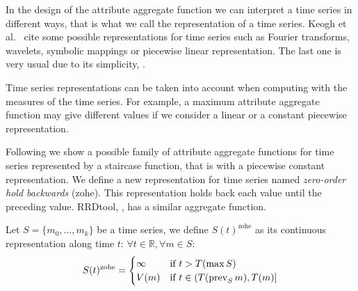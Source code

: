 


In the design of the attribute aggregate function we can interpret a
time series in different ways, that is what we call the representation
of a time series. Keogh et al.\ \cite{last:keogh} cite
some possible representations for time series such as Fourier
transforms, wavelets, symbolic mappings or piecewise linear
representation. The last one is very usual due to its simplicity,
\cite{keogh01}.

Time series representations can be taken into account when computing
with the measures of the time series.  For example, a maximum
attribute aggregate function may give different values if we consider
a linear or a constant piecewise representation.

Following we show a possible family of attribute aggregate functions
for time series represented by a staircase function, that is with a
piecewise constant representation.  We define a new representation for
time series named \emph{zero-order hold backwards} (zohe). This
representation holds back each value until the preceding value. 
RRDtool, \cite{lisa98:oetiker}, has a similar aggregate function.

Let $S=\{m_0,\ldots,m_k\}$ be a time series, we define
$S(t)^{\text{zohe}}$ as its continuous representation along time $t$:
$\forall t \in \mathbb{R} ,\forall m \in S:$
\begin{equation}
 S(t)^{\text{zohe}} =  
\begin{cases}
  \infty & \text{if } t > T(\max S) \\
  V(m)   & \text{if } t\in (T(\operatorname*{prev}_S m),T(m)]
\end{cases}
\label{eq:zohe}
\end{equation}


